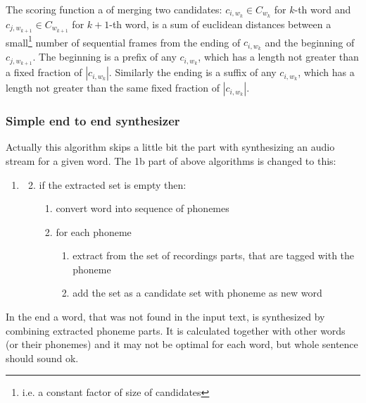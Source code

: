 \documentclass[12pt,a4paper,english]{article}
\begin{document}
The scoring function a of merging two candidates: $c_{i,w_k} \in C_{w_k}$ for $k$-th word and $c_{j,w_{k+1}} \in C_{w_{k+1}}$ for $k+1$-th word, is a sum of euclidean distances between a small\footnote{i.e. a constant factor of size of candidates} number of sequential frames from the ending of $c_{i,w_k}$ and the beginning of $c_{j,w_{k+1}}$. \newline
The beginning is a prefix of any $c_{i,w_k}$, which has a length not greater than a fixed fraction of $|c_{i,w_k}|$. \newline
Similarly the ending is a suffix of any $c_{i,w_k}$, which has a length not greater than the same fixed fraction of $|c_{i,w_k}|$. 

\newpage

\subsubsection{Simple end to end synthesizer}

Actually this algorithm skips a little bit the part with synthesizing an audio stream for a given word.
The 1b part of above algorithms is changed to this:

\begin{enumerate}
\item
    \begin{enumerate}
        \setcounter{enumii}{1}
        \item if the extracted set is empty then:
        \begin{enumerate}
            \item convert word into sequence of phonemes
            \item for each phoneme
            \begin{enumerate}
                \item extract from the set of recordings parts, that are tagged with the phoneme
                \item add the set as a candidate set with phoneme as new word
            \end{enumerate}
        \end{enumerate}
    \end{enumerate}
\end{enumerate}

In the end a word, that was not found in the input text, is synthesized by combining extracted phoneme parts. \newline
It is calculated together with other words (or their phonemes) and it may not be optimal for each word, but whole sentence should sound ok. \newline
\newline
\end{document}
